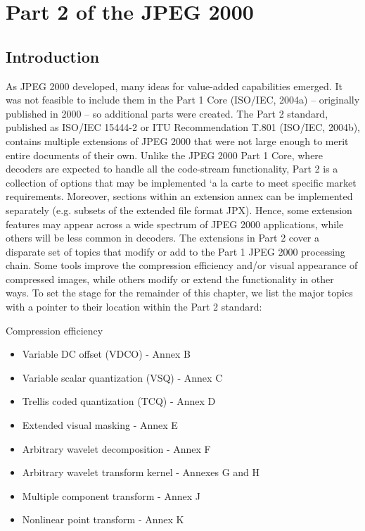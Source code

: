 \section{Part 2 of the JPEG 2000}


\subsection{Introduction}

As JPEG 2000 developed, many ideas for value-added capabilities emerged. It was not
feasible to include them in the Part 1 Core (ISO/IEC, 2004a) – originally published
in 2000 – so additional parts were created. The Part 2 standard, published as ISO/IEC
15444-2 or ITU Recommendation T.801 (ISO/IEC, 2004b), contains multiple extensions
of JPEG 2000 that were not large enough to merit entire documents of their own.
Unlike the JPEG 2000 Part 1 Core, where decoders are expected to handle all the
code-stream functionality, Part 2 is a collection of options that may be implemented `a la
carte to meet specific market requirements. Moreover, sections within an extension annex
can be implemented separately (e.g. subsets of the extended file format JPX). Hence,
some extension features may appear across a wide spectrum of JPEG 2000 applications,
while others will be less common in decoders.
The extensions in Part 2 cover a disparate set of topics that modify or add to the Part 1
JPEG 2000 processing chain. Some tools improve the compression efficiency and/or visual
appearance of compressed images, while others modify or extend the functionality in other
ways. To set the stage for the remainder of this chapter, we list the major topics with a
pointer to their location within the Part 2 standard:

Compression efficiency
\begin{itemize}
    \item Variable DC offset (VDCO) - Annex B
    \item Variable scalar quantization (VSQ) - Annex C
    \item Trellis coded quantization (TCQ) - Annex D
    \item Extended visual masking - Annex E
    \item Arbitrary wavelet decomposition - Annex F
    \item Arbitrary wavelet transform kernel - Annexes G and H
    \item Multiple component transform - Annex J
    \item Nonlinear point transform - Annex K
\end{itemize}

